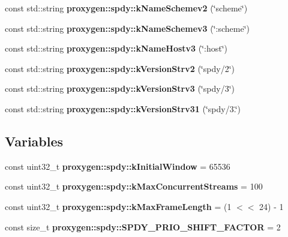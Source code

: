 \begin{DoxyCompactItemize}
\item 
const std\+::string {\bf proxygen\+::spdy\+::k\+Name\+Schemev2} (\char`\"{}scheme\char`\"{})
\item 
const std\+::string {\bf proxygen\+::spdy\+::k\+Name\+Schemev3} (\char`\"{}\+:scheme\char`\"{})
\item 
const std\+::string {\bf proxygen\+::spdy\+::k\+Name\+Hostv3} (\char`\"{}\+:host\char`\"{})
\item 
const std\+::string {\bf proxygen\+::spdy\+::k\+Version\+Strv2} (\char`\"{}spdy/2\char`\"{})
\item 
const std\+::string {\bf proxygen\+::spdy\+::k\+Version\+Strv3} (\char`\"{}spdy/3\char`\"{})
\item 
const std\+::string {\bf proxygen\+::spdy\+::k\+Version\+Strv31} (\char`\"{}spdy/3.\char`\"{})
\end{DoxyCompactItemize}
\subsection*{Variables}
\begin{DoxyCompactItemize}
\item 
const uint32\+\_\+t {\bf proxygen\+::spdy\+::k\+Initial\+Window} = 65536
\item 
const uint32\+\_\+t {\bf proxygen\+::spdy\+::k\+Max\+Concurrent\+Streams} = 100
\item 
const uint32\+\_\+t {\bf proxygen\+::spdy\+::k\+Max\+Frame\+Length} = (1 $<$$<$ 24) -\/ 1
\item 
const size\+\_\+t {\bf proxygen\+::spdy\+::\+S\+P\+D\+Y\+\_\+\+P\+R\+I\+O\+\_\+\+S\+H\+I\+F\+T\+\_\+\+F\+A\+C\+T\+OR} = 2
\end{DoxyCompactItemize}
